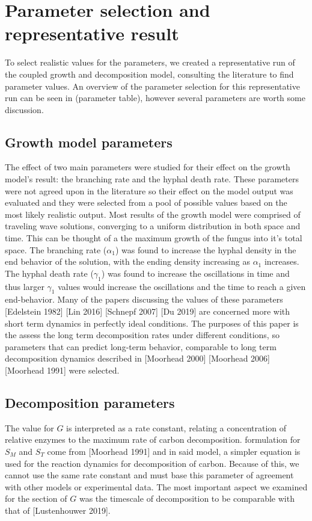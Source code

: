 \documentclass[10pt]{article}
\begin{document}
\section*{Parameter selection and representative result}
To select realistic values for the parameters, we created a representative run of the coupled growth and decomposition model, consulting the literature to find parameter values. An overview of the parameter selection for this representative run can be seen in (parameter table), however several parameters are worth some discussion. 
\subsection*{Growth model parameters}
The effect of two main parameters were studied for their effect on the growth model's result: the branching rate and the hyphal death rate. These parameters were not agreed upon in the literature so their effect on the model output was evaluated and they were selected from a pool of possible values based on the most likely realistic output. Most results of the growth model were comprised of traveling wave solutions, converging to a uniform distribution in both space and time. This can be thought of a the maximum growth of the fungus into it's total space. The branching rate ($\alpha_{1}$) was found to increase the hyphal density in the end behavior of the solution, with the ending density increasing as $\alpha_{1}$ increases. The hyphal death rate ($\gamma_{1}$) was found to increase the oscillations in time and thus larger $\gamma_{1}$ values would increase the oscillations and the time to reach a given end-behavior. Many of the papers discussing the values of these parameters [Edelstein 1982] [Lin 2016] [Schnepf 2007] [Du 2019] are concerned more with short term dynamics in perfectly ideal conditions. The purposes of this paper is the assess the long term decomposition rates under different conditions, so parameters that can predict long-term behavior, comparable to long term decomposition dynamics described in [Moorhead 2000] [Moorhead 2006] [Moorhead 1991] were selected.
\subsection*{Decomposition parameters}
The value for $G$ is interpreted as a rate constant, relating a concentration of relative enzymes to the maximum rate of carbon decomposition. formulation for $S_{M}$ and $S_{T}$ come from [Moorhead 1991] and in said model, a simpler equation is used for the reaction dynamics for decomposition of carbon. Because of this, we cannot use the same rate constant and must base this parameter of agreement with other models or experimental data. The most important aspect we examined for the section of $G$ was the timescale of decomposition to be comparable with that of [Lustenhouwer 2019].
\end{document}
